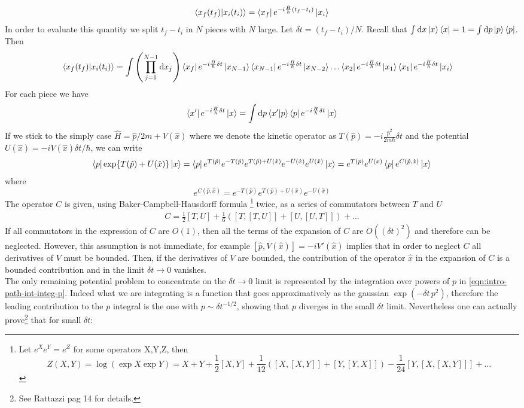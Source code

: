 \documentclass[../main/main.tex]{subfiles}
\begin{document}
\[\braket{x_f(t_f)}{x_i(t_i)}=\bra{x_f}e^{-i\frac{\hat H}{\hbar}(t_f-t_i)}\ket{x_i}\]
In order to evaluate this quantity we split $t_f-t_i$ in $N$ pieces with $N$ large. Let $\delta t=(t_f-t_i)/N$. Recall that $\int\textup{d} x\ket{x}\bra{x}=1=\int\textup{d} p\ket{p}\bra{p}$. Then
\begin{align}\label{eqn:intro-Path-Int-deco}
\braket{x_f(t_f)}{x_i(t_i)}=\int\left(\prod_{j=1}^{N-1}\textup{d} x_j\right)
&\bra{x_f}e^{-i\frac{\hat H}{\hbar}\delta t}\ket{x_{N-1}}
\bra{x_{N-1}}e^{-i\frac{\hat H}{\hbar}\delta t}\ket{x_{N-2}}
\dots
\bra{x_2}e^{-i\frac{\hat H}{\hbar}\delta t}\ket{x_1}
\bra{x_1}e^{-i\frac{\hat H}{\hbar}\delta t}\ket{x_i}
\end{align}
For each piece we have
\begin{equation}\label{eqn:intro-path-int-integ-p}
\bra{x'}e^{-i\frac{\hat H}{\hbar}\delta t}\ket{x}=\int\textup{d} p\braket{x'}{p}\bra{p}e^{-i\frac{\hat H}{\hbar}\delta t}\ket{x}
\end{equation}
If we stick to the simply case $\hat H=\hat p/2m+V(\hat x)$ where we denote the kinetic operator as $T(\hat p)=-i\frac{\hat p^2}{2m\hbar}\delta t$ and the potential $U(\hat x)=-iV(\hat x)\delta t/\hbar$, we can write
\begin{align*}
\bra{p}\exp{T(\hat p)+U(\hat x)}\ket{x}
=\bra{p}e^{T(\hat p)}e^{-T(\hat p)}e^{T(\hat p)+U(\hat x)}e^{-U(\hat x)}e^{U(\hat x)}\ket{x}=e^{T(p)}e^{U(x)}\bra{p}e^{C(\hat p,\hat x)}\ket{x}
\end{align*}
where
\[e^{C(\hat p,\hat x)}=e^{-T(\hat p)}e^{T(\hat p)+U(\hat x)}e^{-U(\hat x)}\]
The operator $C$ is given, using Baker-Campbell-Hausdorff formula
\footnote{Let $e^Xe^Y=e^Z$ for some operators X,Y,Z, then \[Z(X,Y)=\log(\exp X\exp Y)= X + Y + \frac{1}{2}[X,Y] + \frac{1}{12}\left ([X,[X,Y]] +[Y,[Y,X]]\right )- \frac {1}{24}[Y,[X,[X,Y]]]+\dots\]}
 twice, as a series of commutators between $T$ and $U$
\begin{align*}
C=\frac12[T,U]+\frac{1}6([T,[T,U]]+[U,[U,T]])+...
\end{align*}
If all commutators in the expression of $C$ are $O(1)$, then all the terms of the expansion of $C$ are $O((\delta t)^2)$ and therefore can be neglected. However, this assumption is not immediate, for example $[\hat p,V(\hat x)]=-iV'(\hat x)$ implies that in order to neglect $C$ all derivatives of $V$ must be bounded. Then, if the derivatives of $V$ are bounded, the contribution of the operator $\hat x$ in the expansion of $C$ is a bounded contribution and in the limit $\delta t\to0$ vanishes. \\
The only remaining potential problem to concentrate on the $\delta t\to0$ limit is represented by the integration over powers of $p$ in \eqref{eqn:intro-path-int-integ-p}. Indeed what we are integrating is a function that goes approximatively as the gaussian $\exp(-\delta t\,p^2)$, therefore the leading contribution to the $p$ integral is the one with $p\sim\delta t^{-1/2}$, showing that $p$ diverges in the small $\delta t$ limit. Nevertheless one can actually prove\footnote{See Rattazzi pag 14 for details.} that for small $\delta t$:
\end{document}
